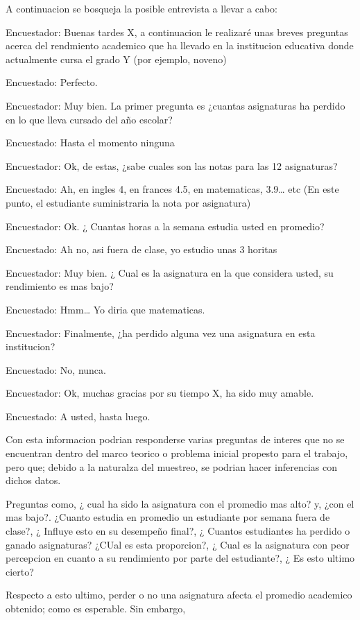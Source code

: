 \documentclass[
]{article}
\begin{document}
A continuacion se bosqueja la posible entrevista a llevar a cabo:

Encuestador: Buenas tardes X, a continuacion le realizaré unas breves
preguntas acerca del rendmiento academico que ha llevado en la
institucion educativa donde actualmente cursa el grado Y (por ejemplo,
noveno)

Encuestado: Perfecto.

Encuestador: Muy bien. La primer pregunta es ¿cuantas asignaturas ha
perdido en lo que lleva cursado del año escolar?

Encuestado: Hasta el momento ninguna

Encuestador: Ok, de estas, ¿sabe cuales son las notas para las 12
asignaturas?

Encuestado: Ah, en ingles 4, en frances 4.5, en matematicas, 3.9\ldots{}
etc (En este punto, el estudiante suministraria la nota por asignatura)

Encuestador: Ok. ¿ Cuantas horas a la semana estudia usted en promedio?

Encuestado: Ah no, asi fuera de clase, yo estudio unas 3 horitas

Encuestador: Muy bien. ¿ Cual es la asignatura en la que considera
usted, su rendimiento es mas bajo?

Encuestado: Hmm\ldots{} Yo diria que matematicas.

Encuestador: Finalmente, ¿ha perdido alguna vez una asignatura en esta
institucion?

Encuestado: No, nunca.

Encuestador: Ok, muchas gracias por su tiempo X, ha sido muy amable.

Encuestado: A usted, hasta luego.

Con esta informacion podrian responderse varias preguntas de interes que
no se encuentran dentro del marco teorico o problema inicial propesto
para el trabajo, pero que; debido a la naturalza del muestreo, se
podrian hacer inferencias con dichos datos.

Preguntas como, ¿ cual ha sido la asignatura con el promedio mas alto?
y, ¿con el mas bajo?. ¿Cuanto estudia en promedio un estudiante por
semana fuera de clase?, ¿ Influye esto en su desempeño final?, ¿ Cuantos
estudiantes ha perdido o ganado asignaturas? ¿CUal es esta proporcion?,
¿ Cual es la asignatura con peor percepcion en cuanto a su rendimiento
por parte del estudiante?, ¿ Es esto ultimo cierto?

Respecto a esto ultimo, perder o no una asignatura afecta el promedio
academico obtenido; como es esperable. Sin embargo,
\end{document}
